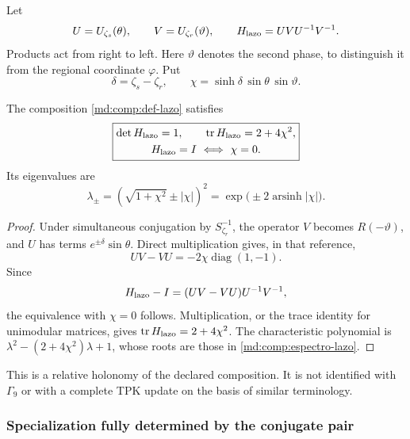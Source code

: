 Let
\begin{equation}
 U=U_{\zeta_s}(\theta),\qquad
 V=U_{\zeta_r}(\vartheta),\qquad
 H_{\rm lazo}=UVU^{-1}V^{-1}.
 \label{md:comp:def-lazo}
\end{equation}
Products act from right to left.
Here \(\vartheta\) denotes the second phase, to distinguish it from
the regional coordinate \(\varphi\). Put
\[
 \delta=\zeta_s-\zeta_r,\qquad
 \chi=\sinh\delta\,\sin\theta\,\sin\vartheta.
\]

\begin{proposition}
\label{md:comp:prop-lazo}
The composition \eqref{md:comp:def-lazo} satisfies
\begin{equation}
 \boxed{\begin{gathered}
 \det H_{\rm lazo}=1,\qquad
 \operatorname{tr}H_{\rm lazo}=2+4\chi^2,\\
 H_{\rm lazo}=I\ \Longleftrightarrow\ \chi=0.
 \end{gathered}}
 \label{md:comp:traza-lazo}
\end{equation}
Its eigenvalues are
\begin{equation}
 \lambda_\pm=(\sqrt{1+\chi^2}\pm|\chi|)^2
 =\exp\bigl(\pm2\operatorname{arsinh}|\chi|\bigr).
 \label{md:comp:espectro-lazo}
\end{equation}
\end{proposition}
\begin{proof}
Under simultaneous conjugation by \(S_{\zeta_r}^{-1}\), the operator
\(V\) becomes \(R(-\vartheta)\), and \(U\) has terms
\(e^{\pm\delta}\sin\theta\). Direct multiplication gives, in that
reference,
\[
 UV-VU=-2\chi\operatorname{diag}(1,-1).
\]
Since
\[
 H_{\rm lazo}-I=(UV-VU)U^{-1}V^{-1},
\]
the equivalence with \(\chi=0\) follows. Multiplication, or the
trace identity for unimodular matrices, gives
\(\operatorname{tr}H_{\rm lazo}=2+4\chi^2\).
The characteristic polynomial is
\(\lambda^2-(2+4\chi^2)\lambda+1\), whose roots are those in
\eqref{md:comp:espectro-lazo}.
\end{proof}

This is a relative holonomy of the declared composition.
It is not identified with \(\Gamma_9\) or with a complete TPK update
on the basis of similar terminology.

\subsubsection{Specialization fully determined by the conjugate pair}
\label{md:comp:lazo-conjugado}

